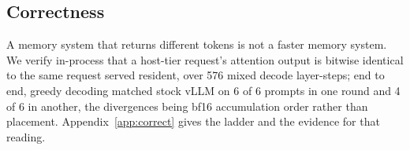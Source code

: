 \subsection{Correctness}
\label{sec:eval:correct}

A memory system that returns different tokens is not a faster memory system. We
verify in-process that a host-tier request's attention output is bitwise identical to
the same request served resident, over 576 mixed decode layer-steps; end to end,
greedy decoding matched stock vLLM on 6 of 6 prompts in one round and 4 of 6 in
another, the divergences being bf16 accumulation order rather than placement.
Appendix~\ref{app:correct} gives the ladder and the evidence for that reading.
